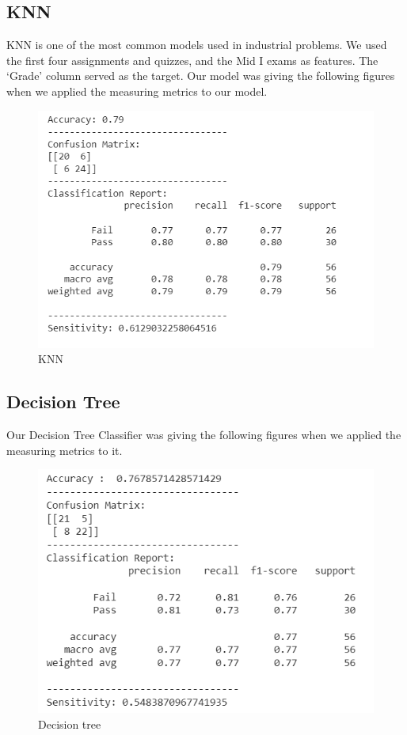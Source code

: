\documentclass[12pt,a4paper]{article}
\begin{document}
\subsection{KNN}
KNN is one of the most common models used in industrial problems. We used the first four assignments and quizzes, and the Mid I exams as features. The ‘Grade’ column served as the target.  
\newline Our model was giving the following figures when we applied the measuring metrics to our model.
\begin{figure}[h]
    \centering
    \includegraphics[scale=0.60]{Other/KNN_Model.png}
    \caption{KNN}
\end{figure}
\newpage
\subsection{Decision Tree}
Our Decision Tree Classifier was giving the following figures when we applied the measuring metrics to it.
\begin{figure}[h]
    \centering
    \includegraphics[scale=0.60]{Other/Decision_tree.png}
    \caption{Decision tree}
\end{figure}
\end{document}
